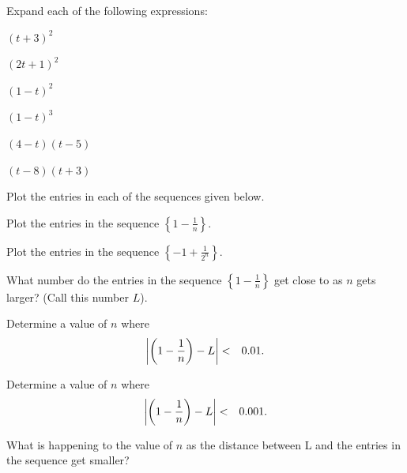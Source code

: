 
\begin{problem}
\item Expand each of the following expressions:
  \begin{subproblem}
    \item $(t+3)^2$
      \vfill
    \item $(2t+1)^2$
      \vfill
    \item $(1-t)^2$
      \vfill
    \item $(1-t)^3$
      \vfill
    \item $(4-t)(t-5)$
      \vfill
    \item $(t-8)(t+3)$
      \vfill
  \end{subproblem}
\end{problem}


\begin{problem}
\item Plot the entries in each of the sequences given below.
  \begin{subproblem}
    \item Plot the entries in the sequence $\left\{ 1-\frac{1}{n}\right\}$.

      \scalebox{0.7}{}

    \item Plot the entries in the sequence $\left\{ -1+\frac{1}{2^n}\right\}$.

      \scalebox{0.7}{}

      \clearpage

    \item What number do the entries in the sequence
      $\left\{ 1-\frac{1}{n}\right\}$ get close to as $n$ gets larger?
      (Call this number $L$).

    \item Determine a value of $n$ where 
      \begin{eqnarray*}
        \left| \left( 1-\frac{1}{n} \right) - L \right| & < & 0.01.
      \end{eqnarray*}

      \vfill

    \item Determine a value of $n$ where 
      \begin{eqnarray*}
        \left| \left( 1-\frac{1}{n}\right) - L \right| & < & 0.001.
      \end{eqnarray*}

      \vfill

    \item What is happening to the value of $n$ as the distance
      between L and the entries in the sequence get smaller?

      \vspace{3em}

  \end{subproblem}
\end{problem}

